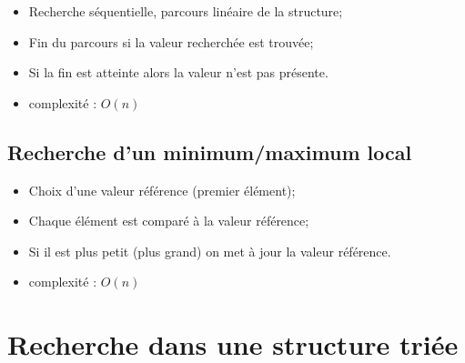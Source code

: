 \documentclass[12pt,a4paper]{article}
\begin{document}
\begin{itemize}
	\item Recherche séquentielle, parcours linéaire de la structure;
	\item Fin du parcours si la valeur recherchée est trouvée;
	\item Si la fin est atteinte alors la valeur n'est pas présente.
	\item complexité : $O(n)$
\end{itemize}

\begin{algorithm}[h!]
\end{algorithm}

\newpage

\subsection{Recherche d'un minimum/maximum local}

\begin{itemize}
	\item Choix d'une valeur référence (premier élément);
	\item Chaque élément est comparé à la valeur référence;
	\item Si il est plus petit (plus grand) on met à jour la valeur référence.
	\item complexité : $O(n)$
\end{itemize}

	\begin{algorithm}[h!]
	\end{algorithm}

\newpage

\section{Recherche dans une structure triée}
\end{document}
